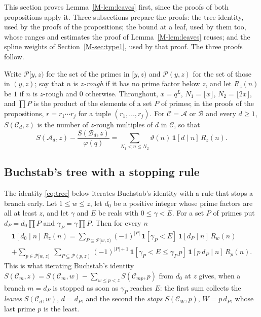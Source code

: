 \documentclass[11pt]{article}
\numberwithin{equation}{section}
\begin{document}
This section proves Lemma~\ref{M-lem:leaves} first, since the proofs of both propositions apply it. Three subsections
prepare the proofs: the tree identity, used by the proofs of the propositions; the bound at a leaf, used by them too,
whose ranges and estimates the proof of Lemma~\ref{M-lem:leaves} reuses; and the spline weights of
Section~\ref{M-sec:type1}, used by that proof. The three proofs follow.

Write $\mathcal P[y, z)$ for the set of the primes in $[y, z)$ and $\mathcal P(y, z)$ for the set of those in $(y, z)$;
say that $n$ is \emph{$z$-rough} if it has no prime factor below $z$, and let $R_z(n)$ be $1$ if $n$ is $z$-rough and
$0$ otherwise. Throughout, $x = q^L$, $N_1 = \lfloor x \rfloor$, $N_2 = \lfloor 2x \rfloor$, and $\prod P$ is the
product of the elements of a set $P$ of primes; in the proofs of the propositions, $r = r_1 \cdots r_j$ for a tuple
$(r_1, \dots, r_j)$. For
$\mathcal C = \mathcal A$ or $\mathcal B$ and every $d \ge 1$, $S(\mathcal C_d, z)$ is the number of $z$-rough multiples
of $d$ in $\mathcal C$, so that
\begin{equation}\label{eq:SAB}
  S(\mathcal A_d, z) - \frac{S(\mathcal B_d, z)}{\varphi(q)} = \sum_{N_1 < n \le N_2} \vartheta(n) \, \mathbf 1[d \mid
  n]
  \, R_z(n).
\end{equation}

\subsection*{Buchstab's tree with a stopping rule}

The identity \eqref{eq:tree} below iterates Buchstab's identity with a rule that stops a branch early. Let $1 \le w
\le z$, let $d_0$ be a positive integer whose prime factors are all at least $z$, and let $\gamma$ and $E$
be reals with $0 \le \gamma < E$. For a set $P$ of primes put $d_P = d_0 \prod P$ and $\gamma_P = \gamma \prod P$. Then
for every $n$
\begin{multline}\label{eq:tree}
  \mathbf 1[d_0 \mid n] \, R_z(n)
  = \sum_{P \subseteq \mathcal P[w, z)} (-1)^{|P|} \, \mathbf 1[\gamma_P < E] \, \mathbf 1[d_P \mid n] \, R_w(n) \\
  + \sum_{p \in \mathcal P[w, z)} \ \sum_{P \subseteq \mathcal P(p, z)} (-1)^{|P| + 1} \,
    \mathbf 1[\gamma_P < E \le \gamma_P \, p] \, \mathbf 1[p \, d_P \mid n] \, R_p(n).
\end{multline}
This is what iterating Buchstab's identity $S(\mathcal C_m, z) = S(\mathcal C_m, w) - \sum_{w \le p < z} S(\mathcal
C_{mp}, p)$ from $d_0$ at $z$ gives, when a branch $m = d_P$ is stopped as soon as $\gamma_P$ reaches $E$: the first sum
collects the \emph{leaves} $S(\mathcal C_d, w)$, $d = d_P$, and the second the \emph{stops} $S(\mathcal C_W, p)$, $W = p
\, d_P$, whose last prime $p$ is the least.
\end{document}

